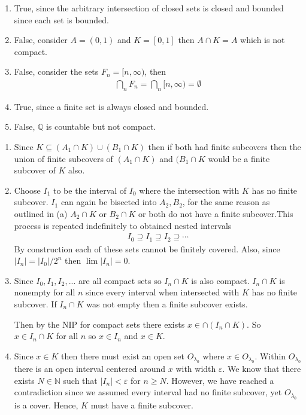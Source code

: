 \begin{enumerate}[label=(\alph*)]
    \item 
    True, since the arbitrary intersection of closed sets is closed and 
    bounded since each set is bounded.

    \item 
    False, consider $A=(0,1)$ and $K=[0,1]$ then $A\cap K=A$ which is not
    compact.

    \item False, consider the sets $F_n=[n, \infty)$, then 
    \begin{align*}
        \bigcap_n F_n = \bigcap_n [n, \infty) = \emptyset
    \end{align*}

    \item True, since a finite set is always closed and bounded.
    \item False, $\mathbb{Q}$ is countable but not compact.
\end{enumerate}

\begin{enumerate}[label=(\alph*)]
    \item 
    Since $K \subseteq (A_1\cap K) \cup (B_1\cap K)$ then if both had 
    finite subcovers then the union of finite subcovers of $(A_1\cap K)$
    and $(B_1\cap K$ would be a finite subcover of $K$ also.

    \item 
    Choose $I_1$ to be the interval of $I_0$ where the intersection 
    with $K$ has no finite subcover.
    $I_1$ can again be bisected into $A_2, B_2$, for the same reason as outlined in (a)
    $A_2\cap K$ or $ B_2\cap K$ or both do not have a finite subcover.This process is 
    repeated indefinitely to obtained nested intervals 
    \begin{align}
        I_0 \supseteq I_1 \supseteq I_2 \supseteq \cdots
    \end{align}
    By construction each of these sets cannot be finitely covered.
    Also, since $|I_n| = |I_0|/2^n$ then $\lim |I_n| = 0$.

    \item 
    Since $I_0, I_1, I_2, ...$ are all compact sets so $I_n \cap K$ is
    also compact. $I_n \cap K$ is nonempty for all $n$ since every interval 
    when intersected with $K$ has no finite subcover. If $I_n\cap K$ was 
    not empty then a finite subcover exists.
    
    Then by the NIP for compact sets 
    there exists $x \in \cap (I_n\cap K)$. So $x\in I_n\cap K$ for all $n$ 
    so $x\in I_n$ and $x\in K$.

    \item
    Since $x\in K$ then there must exist an open set $O_{\lambda_0}$
    where $x\in O_{\lambda_0}$. Within $O_{\lambda_0}$ there is an open interval 
    centered around $x$ with width $\varepsilon$. We know that there exists $N\in \mathbb{N}$
    such that $|I_n|< \varepsilon$ for $n\geq N$. However, we have reached a contradiction
    since we assumed every interval had no finite subcover, yet $O_{\lambda_0}$ is a
    cover. Hence, $K$ must have a finite subcover.
\end{enumerate}

